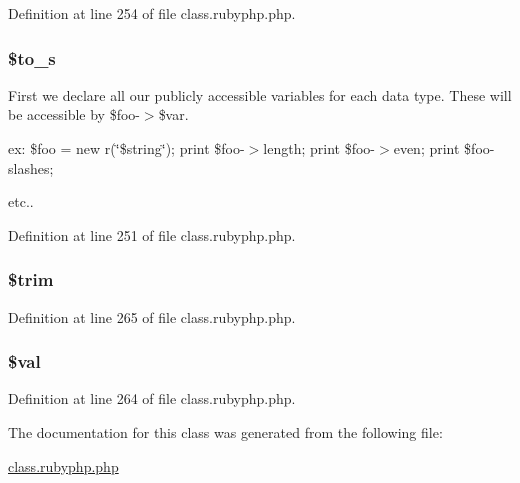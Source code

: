 Definition at line 254 of file class.\-rubyphp.\-php.

\hypertarget{classr_a5469620d055732b419fff71704232d2f}{
\subsubsection[{\$to\-\_\-s}]{\setlength{\rightskip}{0pt plus 5cm}\${\bf to\-\_\-s}}}\label{classr_a5469620d055732b419fff71704232d2f}
First we declare all our publicly accessible variables for each data type. These will be accessible by \$foo-\/$>$\$var.

ex\-: \$foo = new r(\char`\"{}\$string\char`\"{}); print \$foo-\/$>$length; print \$foo-\/$>$even; print \$foo-\/slashes;

etc.. 

Definition at line 251 of file class.\-rubyphp.\-php.

\hypertarget{classr_a0ca8b395aaa07c4aac3bdb1f9964d4f5}{
\subsubsection[{\$trim}]{\setlength{\rightskip}{0pt plus 5cm}\$trim}}\label{classr_a0ca8b395aaa07c4aac3bdb1f9964d4f5}


Definition at line 265 of file class.\-rubyphp.\-php.

\hypertarget{classr_aac81a74a7b30767af29bfd9a695636df}{
\subsubsection[{\$val}]{\setlength{\rightskip}{0pt plus 5cm}\${\bf val}}}\label{classr_aac81a74a7b30767af29bfd9a695636df}


Definition at line 264 of file class.\-rubyphp.\-php.



The documentation for this class was generated from the following file\-:\begin{DoxyCompactItemize}
\item 
\hyperlink{class_8rubyphp_8php}{class.\-rubyphp.\-php}\end{DoxyCompactItemize}
